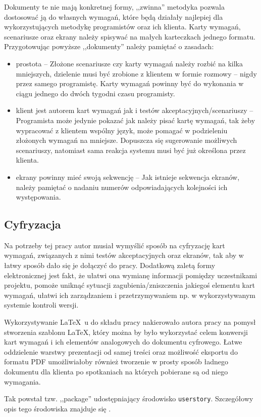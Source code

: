 Dokumenty te nie mają konkretnej formy, ,,zwinna'' metodyka pozwala dostosować ją do własnych wymagań, które będą działały najlepiej dla wykorzystujących metodykę programistów oraz ich klienta. Karty wymagań, scenariusze oraz ekrany należy spisywać na małych karteczkach jednego formatu. Przygotowując powyższe ,,dokumenty'' należy pamiętać o zasadach:
\begin{itemize}
    \item prostota -- Złożone scenariusze czy karty wymagań należy rozbić na kilka mniejszych, dzielenie musi być zrobione z klientem w formie rozmowy -- nigdy przez samego programistę. Karty wymagań powinny być do wykonania w ciągu jednego do dwóch tygodni czasu programisty.
    \item klient jest autorem kart wymagań jak i testów akceptacyjnych/scenariuszy -- Programista może jedynie pokazać jak należy pisać kartę wymagań, tak żeby wypracować z klientem wspólny język, może pomagać w podzieleniu złożonych wymagań na mniejsze. Dopuszcza się sugerowanie możliwych scenariuszy, natomiast sama reakcja systemu musi być już określona przez klienta.
    \item ekrany powinny mieć swoją sekwencję -- Jak istnieje sekwencja ekranów, należy pamiętać o nadaniu numerów odpowiadających kolejności ich występowania.
\end{itemize}

\subsection{Cyfryzacja}
\label{sec:ZSWcyfryzacja}

Na potrzeby tej pracy autor musiał wymyślić sposób na cyfryzację kart wymagań, związanych z nimi testów akceptacyjnych oraz ekranów, tak aby w łatwy sposób dało się je dołączyć do pracy. Dodatkową zaletą formy elektronicznej jest fakt, że ułatwi ona wymianę informacji pomiędzy uczestnikami projektu, pomoże uniknąć sytuacji zagubienia/zniszczenia jakiegoś elementu kart wymagań, ułatwi ich zarządzaniem i przetrzymywaniem np. w wykorzystywanym systemie kontroli wersji.

Wykorzystywanie \LaTeX~u do składu pracy nakierowało autora pracy na pomysł stworzenia szablonu \LaTeX, który można by było wykorzystać celem konwersji kart wymagań i ich elementów analogowych do dokumentu cyfrowego. Łatwe oddzielenie warstwy prezentacji od samej treści oraz możliwość eksportu do formatu PDF umożliwiałoby również tworzenie w prosty sposób ładnego dokumentu dla klienta po spotkaniach na których pobierane są od niego wymagania.

Tak powstał tzw. ,,package'' udostępniający środowisko \texttt{userstory}. Szczegółowy opis tego środowiska znajduje się .

\newpage

